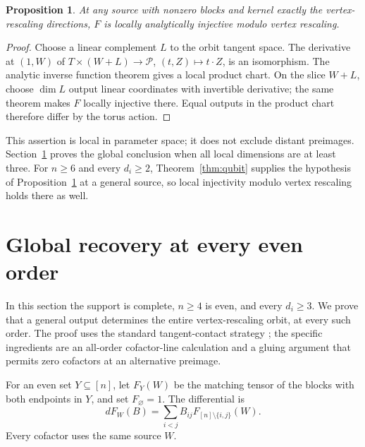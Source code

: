 \documentclass[11pt]{article}
\newtheorem{proposition}[theorem]{Proposition}
\theoremstyle{remark}\newtheorem{remark}[theorem]{Remark}
\newcommand{\cP}{\mathcal P}
\begin{document}
\begin{proposition}\label{prop:local}
At any source with nonzero blocks and kernel exactly the vertex-rescaling directions, $F$ is locally analytically injective modulo vertex rescaling.
\end{proposition}
\begin{proof}
Choose a linear complement $L$ to the orbit tangent space. The derivative at $(1,W)$ of $T\times(W+L)\to\cP$, $(t,Z)\mapsto t\cdot Z$, is an isomorphism. The analytic inverse function theorem gives a local product chart. On the slice $W+L$, choose $\dim L$ output linear coordinates with invertible derivative; the same theorem makes $F$ locally injective there. Equal outputs in the product chart therefore differ by the torus action.
\end{proof}
This assertion is local in parameter space; it does not exclude distant preimages. Section~\ref{sec:global-all} proves the global conclusion when all local dimensions are at least three. For $n\geq6$ and every $d_i\geq2$, Theorem~\ref{thm:qubit} supplies the hypothesis of Proposition~\ref{prop:local} at a general source, so local injectivity modulo vertex rescaling holds there as well.


\section{Global recovery at every even order}\label{sec:global-all}
In this section the support is complete, $n\geq4$ is even, and every
$d_i\geq3$. We prove that a general output determines the entire
vertex-rescaling orbit, at every such order. The proof uses the
standard tangent-contact strategy \cite{co,ballico}; the specific
ingredients are an all-order cofactor-line calculation and a gluing
argument that permits zero cofactors at an alternative preimage.

For an even set $Y\subseteq[n]$, let $F_Y(W)$ be the matching tensor
of the blocks with both endpoints in $Y$, and set $F_\varnothing=1$.
The differential is
\[
 dF_W(B)=\sum_{i<j}B_{ij}F_{[n]\setminus\{i,j\}}(W).
\]
Every cofactor uses the same source $W$.
\end{document}
